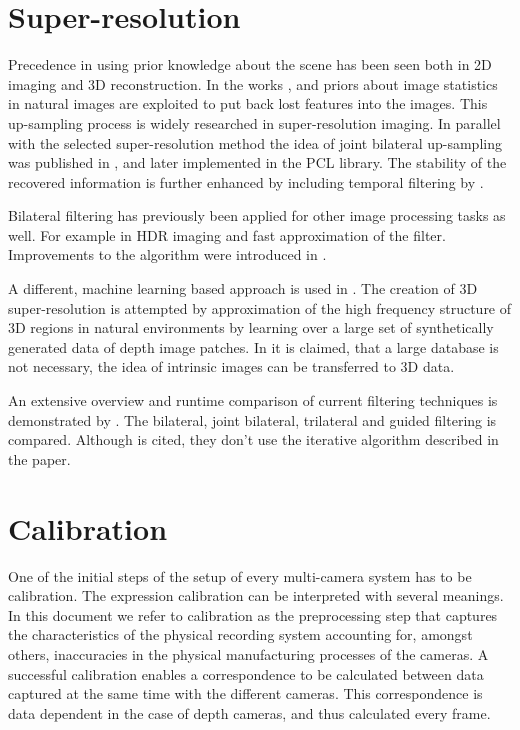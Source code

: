 \documentclass{ucl_thesis}
\begin{document}
\section{Super-resolution}
\label{sec:super_resolution}

\par Precedence in using prior knowledge about the scene has been seen both in 2D imaging and 3D reconstruction. In the works \cite{HaCohen10}, \cite{JSun:2010} and \cite{DBLP:dblp_conf/eccv/TappenL12} priors about image statistics in natural images are exploited to put back lost features into the images. This up-sampling process is widely researched in super-resolution imaging. In parallel with the selected super-resolution method \citep{cvpr-07-qingxiong-yang} the idea of joint bilateral up-sampling was published in \citep{Kopf:2007}, and later implemented in the PCL library. The stability of the recovered information is further enhanced by including temporal filtering by \citep{RGBZcamera}.

\par Bilateral filtering has previously been applied for other image processing tasks as well. For example in HDR imaging \citep{Durand:2002} and fast approximation of the filter. Improvements to the algorithm were introduced in \citep{Paris:2009}.

\par A different, machine learning based approach is used in \cite{MacAodhaDepthSuperResECCV2012}. The creation of 3D super-resolution is attempted by approximation of the high frequency structure of 3D regions in natural environments by learning over a large set of synthetically generated data of depth image patches. In \citep{TUW-218846} it is claimed, that a large database is not necessary, the idea of intrinsic images can be transferred to 3D data. 

\par An extensive overview and runtime comparison of current filtering techniques is demonstrated by \citep{MatsuoFI13}. The bilateral, joint bilateral, trilateral and guided filtering is compared. Although \citep{cvpr-07-qingxiong-yang} is cited, they don't use the iterative algorithm described in the paper.


\section{Calibration}
\label{sec:lit_calib}

One of the initial steps of the setup of every multi-camera system has to be calibration. The expression calibration can be interpreted with several meanings. In this document we refer to calibration as the preprocessing step that captures the characteristics of the physical recording system accounting for, amongst others, inaccuracies in the physical manufacturing processes of the cameras. A successful calibration enables a correspondence to be calculated between data captured at the same time with the different cameras. This correspondence is data dependent in the case of depth cameras, and thus calculated every frame.\\
\end{document}
